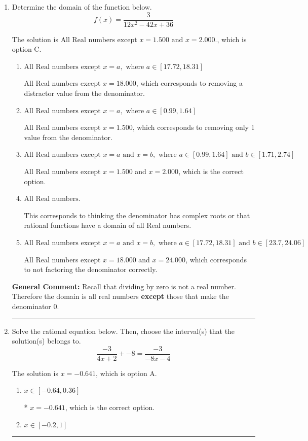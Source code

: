 \documentclass{extbook}[14pt]
\newcommand{\litem}[1]{\item #1

\rule{\textwidth}{0.4pt}}
\begin{document}
\begin{enumerate}\litem{
Determine the domain of the function below.
\[ f(x) = \frac{3}{12x^{2} -42 x + 36} \]

The solution is \( \text{All Real numbers except } x = 1.500 \text{ and } x = 2.000. \), which is option C.\begin{enumerate}[label=\Alph*.]
\item \( \text{All Real numbers except } x = a, \text{ where } a \in [17.72, 18.31] \)

All Real numbers except $x = 18.000$, which corresponds to removing a distractor value from the denominator.
\item \( \text{All Real numbers except } x = a, \text{ where } a \in [0.99, 1.64] \)

All Real numbers except $x = 1.500$, which corresponds to removing only 1 value from the denominator.
\item \( \text{All Real numbers except } x = a \text{ and } x = b, \text{ where } a \in [0.99, 1.64] \text{ and } b \in [1.71, 2.74] \)

All Real numbers except $x = 1.500$ and $x = 2.000$, which is the correct option.
\item \( \text{All Real numbers.} \)

This corresponds to thinking the denominator has complex roots or that rational functions have a domain of all Real numbers.
\item \( \text{All Real numbers except } x = a \text{ and } x = b, \text{ where } a \in [17.72, 18.31] \text{ and } b \in [23.7, 24.06] \)

All Real numbers except $x = 18.000$ and $x = 24.000$, which corresponds to not factoring the denominator correctly.
\end{enumerate}

\textbf{General Comment:} Recall that dividing by zero is not a real number. Therefore the domain is all real numbers \textbf{except} those that make the denominator 0.
}
\litem{
Solve the rational equation below. Then, choose the interval(s) that the solution(s) belongs to.
\[ \frac{-3}{4x + 2} + -8 = \frac{-3}{-8x -4} \]

The solution is \( x = -0.641 \), which is option A.\begin{enumerate}[label=\Alph*.]
\item \( x \in [-0.64,0.36] \)

* $x = -0.641$, which is the correct option.
\item \( x \in [-0.2,1] \)


\end{enumerate}}
\end{enumerate}
\end{document}
